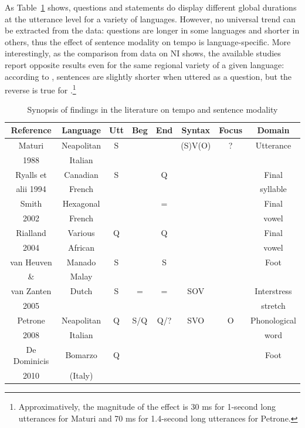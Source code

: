 As Table~\ref{tab41} shows, questions and statements do display different global durations at the utterance level for a variety of languages. However, no universal trend can be extracted from the data: questions are longer in some languages and shorter in others, thus the effect of sentence modality on tempo is language-specific. More interestingly, as the comparison from data on NI shows, the available studies report opposite results even for the same regional variety of a given language: according to \citet[table 6]{maturi1988intonazione}, sentences are slightly shorter when uttered as a question, but the reverse is true for \citet[163]{petrone2008role}.\footnote{Approximatively, the magnitude of the effect is 30 ms for 1-second long utterances for Maturi and 70 ms for 1.4-second long utterances for Petrone.} 

\begin{landscape}
\begin{table}[p]
\centering
\begin{tabular}{c c c c c c c c}
Reference & Language & Utt & Beg & End & Syntax & Focus & Domain \\
\hline\hline
Maturi & Neapolitan & S & & & (S)V(O) & ? & Utterance\\
1988 & Italian & & & & & & \\
\hline
Ryalls et & Canadian & S & & Q & & & Final \\
alii 1994 & French & & & & & & syllable \\
\hline
Smith & Hexagonal & & & = & & & Final \\
2002 & French & & & & & & vowel \\
\hline
Rialland & Various & Q & & Q & & & Final \\
2004 & African & & & & & & vowel \\
\hline
van Heuven & Manado & S & & S & & & Foot \\
\& & Malay & & & & & & \\
van Zanten & Dutch & S & = & = & SOV & & Interstress \\
2005 & & & & & & & stretch \\
\hline
Petrone & Neapolitan & Q & S/Q & Q/? & SVO & O & Phonological \\
2008 & Italian & & & & & & word \\
\hline
De Dominicis & Bomarzo & Q & & & & & Foot \\
2010 & (Italy) & & & & & & \\
\end{tabular}
\caption{Synopsis of findings in the literature on tempo and sentence modality}
\label{tab41}\end{table}
\end{landscape}

